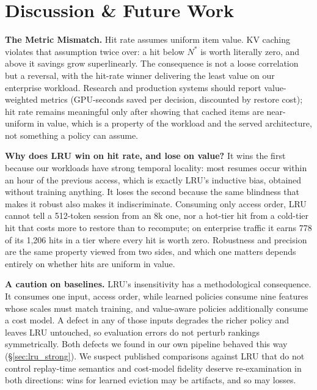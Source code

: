 \documentclass[letterpaper,twocolumn,10pt]{article}
\begin{document}
\section{Discussion \& Future Work}

\textbf{The Metric Mismatch.} Hit rate assumes uniform item value. KV caching violates that assumption twice over: a hit below $N^{*}$ is worth literally zero, and above it savings grow superlinearly. The consequence is not a loose correlation but a reversal, with the hit-rate winner delivering the least value on our enterprise workload. Research and production systems should report value-weighted metrics (GPU-seconds saved per decision, discounted by restore cost); hit rate remains meaningful only after showing that cached items are near-uniform in value, which is a property of the workload and the served architecture, not something a policy can assume.

\textbf{Why does LRU win on hit rate, and lose on value?} It wins the first because our workloads have strong temporal locality: most resumes occur within an hour of the previous access, which is exactly LRU's inductive bias, obtained without training anything. It loses the second because the same blindness that makes it robust also makes it indiscriminate. Consuming only access order, LRU cannot tell a 512-token session from an 8k one, nor a hot-tier hit from a cold-tier hit that costs more to restore than to recompute; on enterprise traffic it earns 778 of its 1,206 hits in a tier where every hit is worth zero. Robustness and precision are the same property viewed from two sides, and which one matters depends entirely on whether hits are uniform in value.

\textbf{A caution on baselines.} LRU's insensitivity has a methodological consequence. It consumes one input, access order, while learned policies consume nine features whose scales must match training, and value-aware policies additionally consume a cost model. A defect in any of those inputs degrades the richer policy and leaves LRU untouched, so evaluation errors do not perturb rankings symmetrically. Both defects we found in our own pipeline behaved this way (\S\ref{sec:lru_strong}). We suspect published comparisons against LRU that do not control replay-time semantics and cost-model fidelity deserve re-examination in both directions: wins for learned eviction may be artifacts, and so may losses.
\end{document}

